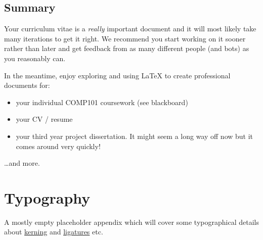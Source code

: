 \documentclass[
]{book}
\providecommand{\tightlist}{%
  \setlength{\itemsep}{0pt}\setlength{\parskip}{0pt}}
\begin{document}
\hypertarget{cvconc}{%
\section{Summary}\label{cvconc}}

Your curriculum vitae is a \emph{really} important document and it will most likely take many iterations to get it right. We recommend you start working on it sooner rather than later and get feedback from as many different people (and bots) as you reasonably can.

In the meantime, enjoy exploring and using LaTeX to create professional documents for:

\begin{itemize}
\tightlist
\item
  your individual COMP101 coursework (see blackboard)
\item
  your CV / resume
\item
  your third year project dissertation. It might seem a long way off now but it comes around very quickly!
\end{itemize}

\ldots and more.

\hypertarget{appendix-appendix}{%
\appendix}


\hypertarget{typography}{%
\chapter{Typography}\label{typography}}

A mostly empty placeholder appendix which will cover some typographical details about \href{https://en.wikipedia.org/wiki/Kerning}{kerning} and \href{https://en.wikipedia.org/wiki/Orthographic_ligature}{ligatures} etc.

  
\end{document}
